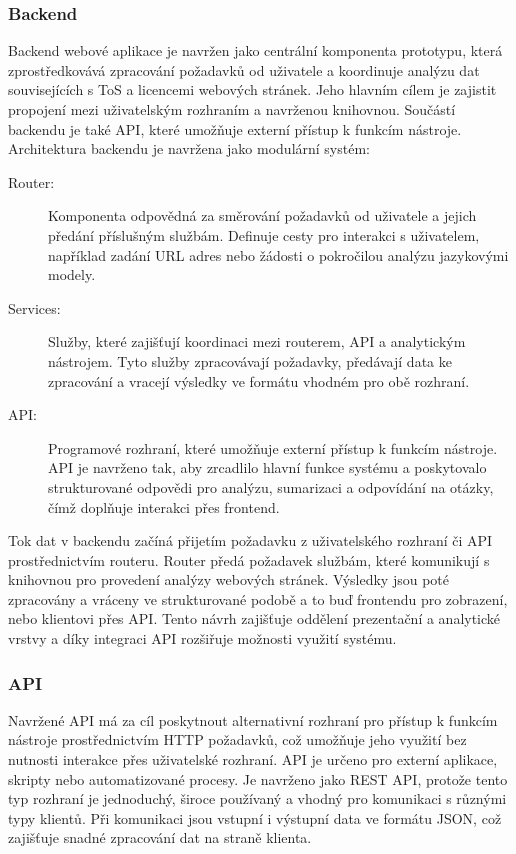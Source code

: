 \subsubsection{Backend}
Backend webové aplikace je navržen jako centrální komponenta prototypu, která zprostředkovává zpracování požadavků od uživatele a koordinuje analýzu dat souvisejících s ToS a licencemi webových stránek.
Jeho hlavním cílem je zajistit propojení mezi uživatelským rozhraním a navrženou knihovnou. Součástí backendu je také API, které umožňuje externí přístup k funkcím nástroje.
Architektura backendu je navržena jako modulární systém:
\begin{description}
    \item[Router:] Komponenta odpovědná za směrování požadavků od uživatele a jejich předání příslušným službám. Definuje cesty pro interakci s uživatelem, například zadání URL adres nebo žádosti o pokročilou analýzu jazykovými modely.
    \item[Services:] Služby, které zajišťují koordinaci mezi routerem, API a analytickým nástrojem. Tyto služby zpracovávají požadavky, předávají data ke zpracování a vracejí výsledky ve formátu vhodném pro obě rozhraní.
    \item[API:] Programové rozhraní, které umožňuje externí přístup k funkcím nástroje. API je navrženo tak, aby zrcadlilo hlavní funkce systému a poskytovalo strukturované odpovědi pro analýzu, sumarizaci a odpovídání na otázky, čímž doplňuje interakci přes frontend.
\end{description}

Tok dat v backendu začíná přijetím požadavku z uživatelského rozhraní či API prostřednictvím routeru.
Router předá požadavek službám, které komunikují s knihovnou pro provedení analýzy webových stránek.
Výsledky jsou poté zpracovány a vráceny ve strukturované podobě a to buď frontendu pro zobrazení, nebo klientovi přes API.
Tento návrh zajišťuje oddělení prezentační a analytické vrstvy a díky integraci API rozšiřuje možnosti využití systému.

\clearpage
\subsubsection{API}
Navržené API má za cíl poskytnout alternativní rozhraní pro přístup k funkcím nástroje prostřednictvím HTTP požadavků, což umožňuje jeho využití bez nutnosti interakce přes uživatelské rozhraní.
API je určeno pro externí aplikace, skripty nebo automatizované procesy.
Je navrženo jako REST API, protože tento typ rozhraní je jednoduchý, široce používaný a vhodný pro komunikaci s různými typy klientů.
Při komunikaci jsou vstupní i výstupní data ve formátu JSON, což zajišťuje snadné zpracování dat na straně klienta.

